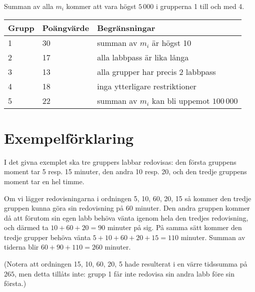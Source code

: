 Summan av alla $m_i$ kommer att vara högst $5\,000$ i grupperna 1 till och med 4.

\begin{tabular}{| l | l | l |}
	\hline
	Grupp & Poängvärde & Begränsningar\\ \hline
  1     & 30         & summan av $m_i$ är högst 10 \\ \hline
  2     & 17         & alla labbpass är lika långa \\ \hline
  3     & 13         & alla grupper har precis 2 labbpass \\ \hline
  4     & 18         & inga ytterligare restriktioner \\ \hline
  5     & 22         & summan av $m_i$ kan bli uppemot $100\,000$ \\ \hline
\end{tabular}

\section*{Exempelförklaring}
I det givna exemplet ska tre gruppers labbar redovisas: den första gruppens moment tar 5 resp. 15 minuter, den andra 10 resp. 20, och den tredje gruppens moment tar en hel timme.

Om vi lägger redovisningarna i ordningen 5, 10, 60, 20, 15 så kommer den tredje gruppen kunna göra sin redovisning på 60 minuter.
Den andra gruppen kommer då att förutom sin egen labb behöva vänta igenom hela den tredjes redovisning, och därmed ta $10+60+20 = 90$ minuter på sig.
På samma sätt kommer den tredje grupper behöva vänta $5+10+60+20+15 = 110$ minuter.
Summan av tiderna blir $60 + 90 + 110 = 260$ minuter.

(Notera att ordningen 15, 10, 60, 20, 5 hade resulterat i en värre tidssumma på $265$, men detta tillåts inte: grupp 1 får inte redovisa sin andra labb före sin första.)
